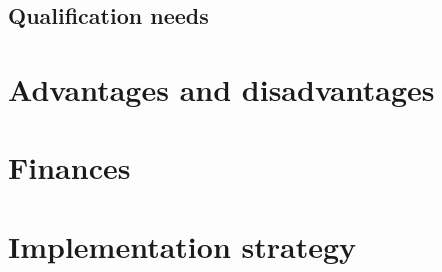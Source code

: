 \subsection{Qualification needs}
\label{sub:qualification_needs}

\section{Advantages and disadvantages}

\section{Finances}

\section{Implementation strategy}


